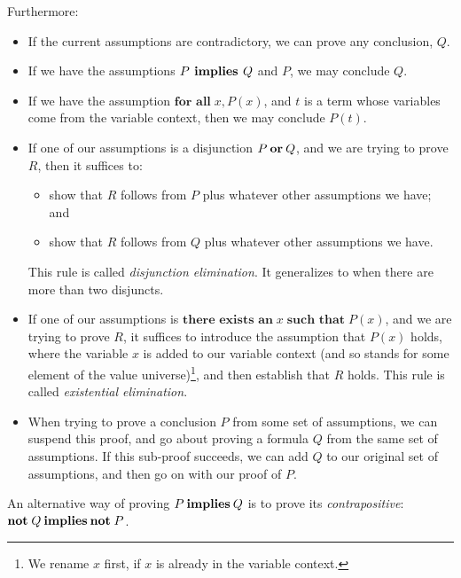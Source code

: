 Furthermore:
\begin{itemize}
\item If the current assumptions are contradictory, we can prove
%
%
  any conclusion, $Q$.

\item If we have the assumptions $P \,\mathbin{\mathbf{implies}}\, Q$ and $P$, we
  may conclude $Q$.

\item If we have the assumption $\textbf{for all}\; x, P(x)$, and $t$ is
  a term whose variables come from the variable context, then
  we may conclude $P(t)$.

\item If one of our assumptions is a disjunction $P \mathbin{\mathbf{or}} Q$,
  and we are trying to prove $R$, then it suffices to:
  \begin{itemize}
  \item show that $R$ follows from $P$ plus whatever other assumptions
    we have; and
  \item show that $R$ follows from $Q$ plus whatever other assumptions
    we have.
  \end{itemize}
  This rule is called \emph{disjunction elimination}. It generalizes
%
%
  to when there are more than two disjuncts.

\item If one of our assumptions is $\textbf{there exists an}\; x
  \;\textbf{such that}\; P(x)$, and we are trying to prove $R$, it
  suffices to introduce the assumption that $P(x)$ holds, where the
  variable $x$ is added to our variable context (and so stands for
  some element of the value universe)\footnote{We rename $x$ first,
  if $x$ is already in the variable context.}, and then establish that $R$
  holds. This rule is called \emph{existential elimination}.
%
%

\item When trying to prove a conclusion $P$ from some set of assumptions,
  we can suspend this proof, and go about proving a formula $Q$ from
  the same set of assumptions. If this sub-proof succeeds, we can
%
%
  add $Q$ to our original set of assumptions, and then go on with
  our proof of $P$.
\end{itemize}

An alternative way of proving $P \mathbin{\mathbf{implies}} Q$ is to prove its
\emph{contrapositive}:
%
%
$\textbf{not}\; Q \mathbin{\mathbf{implies}} \textbf{not}\; P$.

